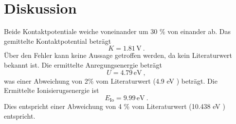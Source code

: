 \section{Diskussion}
\label{sec:Diskussion}
Beide Kontaktpotentiale weiche voneinander um 30 \% von einander ab. Das gemittelte Kontaktpotential beträgt 
\begin{equation}
  K = 1.81 \, \text{V} \ . 
\end{equation}
Über den Fehler kann keine Aussage getroffen werden, da kein Literaturwert bekannt ist. Die ermittelte Anregungsenergie beträgt 
\begin{equation}
  U = 4.79 \, \text{eV} \ ,
\end{equation}
was einer Abweichung von 2\% vom Literaturwert (4.9 eV \cite{Ea}) beträgt. Die Ermittelte Ionisierugsenergie ist
\begin{equation}
  E_\text{Io} = 9.99 \, \text{eV} \ .
\end{equation}
Dies entspricht einer Abweichung von 4 \% vom Literaturwert (10.438 eV \cite{EIo}) entspricht.
